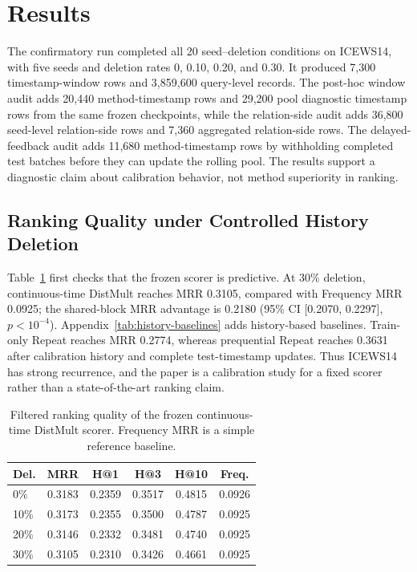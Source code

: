 \documentclass[information,article,submit,oneauthor,pdftex]{Definitions/mdpi}
\begin{document}
\fi


\iffalse
\section{Results}
\label{sec:results}

The confirmatory run completed all 20 seed--deletion conditions on ICEWS14,
with five seeds and deletion rates 0, 0.10, 0.20, and 0.30. It produced 7,300
timestamp-window rows and 3,859,600 query-level records. The post-hoc
window audit adds 20,440 method-timestamp rows and 29,200 pool
diagnostic timestamp rows from the same frozen checkpoints, while the
relation-side audit adds 36,800 seed-level relation-side rows and 7,360
aggregated relation-side rows. The delayed-feedback audit adds 11,680
method-timestamp rows by withholding completed test batches before they can
update the rolling pool. The results support a diagnostic claim about
calibration behavior, not method superiority in ranking.

\subsection{Ranking Quality under Controlled History Deletion}

Table~\ref{tab:ranking} first checks that the frozen scorer is predictive. At
30\% deletion, continuous-time DistMult reaches MRR 0.3105, compared with
Frequency MRR 0.0925; the shared-block MRR advantage is 0.2180
(95\% CI [0.2070, 0.2297], \(p<10^{-4}\)). Appendix~\ref{tab:history-baselines}
adds history-based baselines. Train-only Repeat reaches MRR 0.2774, whereas
prequential Repeat reaches 0.3631 after calibration history and complete
test-timestamp updates. Thus ICEWS14 has strong recurrence, and the paper is a
calibration study for a fixed scorer rather than a state-of-the-art ranking
claim.

\begin{table}[t]
\centering
\caption{Filtered ranking quality of the frozen continuous-time DistMult
scorer. Frequency MRR is a simple reference baseline.}
\label{tab:ranking}
\footnotesize
\setlength{\tabcolsep}{3.2pt}
\begin{tabular}{@{}lccccc@{}}
\toprule
Del. & MRR & H@1 & H@3 & H@10 & Freq.\\
\midrule
0\% & 0.3183 & 0.2359 & 0.3517 & 0.4815 & 0.0926\\
10\% & 0.3173 & 0.2355 & 0.3500 & 0.4787 & 0.0925\\
20\% & 0.3146 & 0.2332 & 0.3481 & 0.4740 & 0.0925\\
30\% & 0.3105 & 0.2310 & 0.3426 & 0.4661 & 0.0925\\
\bottomrule
\end{tabular}
\end{table}
\end{document}
